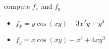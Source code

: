 compute $f_x$ and $f_y$

\soln*

\begin{itemize}
    \item $f_x = y \cos(xy) - 3x^2y + y^4$
    \item $f_y = x \cos(xy) - x^3 + 4xy^3$ 
\end{itemize}
